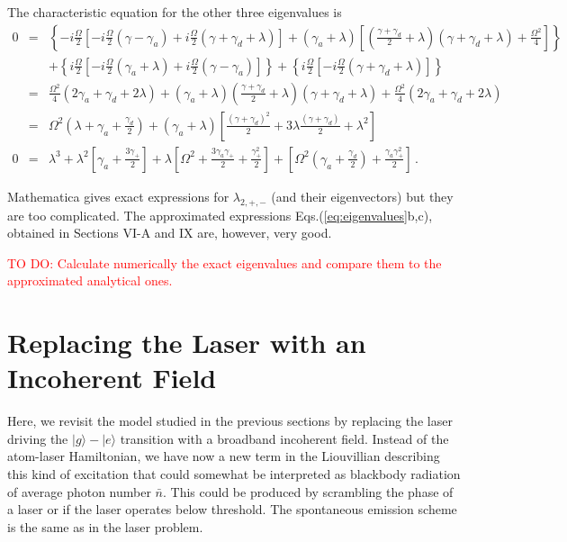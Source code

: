 \documentclass[twocolumn,aps,eqsecnum,showkeys,amsmath]{revtex4-2}
\begin{document}
\begin{widetext}
The characteristic equation for the other three eigenvalues is
%
\begin{eqnarray*} 	
0 &=& \left\{ - i \frac{\Omega}{2} 	\left[  
	- i \frac{\Omega}{2} (\gamma -\gamma_a)   
	+i \frac{\Omega}{2} (\gamma +\gamma_d +\lambda)  \right] 
	+(\gamma_a +\lambda) \left[ (\frac{\gamma +\gamma_d}{2} +\lambda) 
	(\gamma +\gamma_d +\lambda) +\frac{\Omega^2}{4} \right] \right\}  	\\ 
%
&& + \left\{ i \frac{\Omega}{2} \left[ -i \frac{\Omega}{2} (\gamma_a +\lambda)    
	+i \frac{\Omega}{2} (\gamma -\gamma_a)  \right]  \right\} 
+ \left\{ i \frac{\Omega}{2} 
	\left[ - i \frac{\Omega}{2} (\gamma +\gamma_d +\lambda) \right]  \right\} \\ 
%
&=& \frac{\Omega^2}{4} ( 2 \gamma_a +\gamma_d +2 \lambda ) 
+(\gamma_a +\lambda) (\frac{\gamma +\gamma_d}{2} +\lambda) 
	(\gamma +\gamma_d +\lambda) 
+\frac{\Omega^2}{4} ( 2 \gamma_a +\gamma_d +2 \lambda ) \\ 
%
&=& \Omega^2 ( \lambda +\gamma_a +\frac{\gamma_d}{2} ) 
	+(\gamma_a +\lambda) \left[ \frac{( \gamma +\gamma_d)^2}{2} 
	+3\lambda \frac{( \gamma +\gamma_d)}{2} 	+\lambda^2 \right] 	\\ 
%
0 &=& \lambda^3 +\lambda^2 \left[ \gamma_a +\frac{3 \gamma_+}{2} \right] 
+\lambda \left[ \Omega^2 +\frac{3 \gamma_a \gamma_+}{2}   
	+\frac{\gamma_+^2}{2} \right] 
+\left[ \Omega^2 (\gamma_a +\frac{\gamma_d}{2}) 
	+\frac{\gamma_a  \gamma_+^2}{2} \right] 	\,.
\end{eqnarray*}
\end{widetext}
Mathematica gives exact expressions for $\lambda_{2,+,-}$ (and their 
eigenvectors) but they are too complicated. The approximated expressions 
Eqs.(\ref{eq:eigenvalues}b,c), obtained in Sections VI-A and IX are, 
however, very good. 

\textcolor{red}{TO DO: Calculate numerically the exact eigenvalues and 
compare them to the approximated analytical ones.}

\section{Replacing the Laser with an Incoherent Field}
%
Here, we revisit the model studied in the previous sections by replacing 
the laser driving the $|g \rangle - |e \rangle$ transition with a broadband 
incoherent field. Instead of the atom-laser Hamiltonian, we have now a 
new term in the Liouvillian describing this kind of excitation that could 
somewhat be interpreted as blackbody radiation of average photon 
number $\bar{n}$. This could be produced by scrambling the phase of 
a laser or if the laser operates below threshold. The spontaneous 
emission scheme is the same as in the laser problem. 
\end{document}
